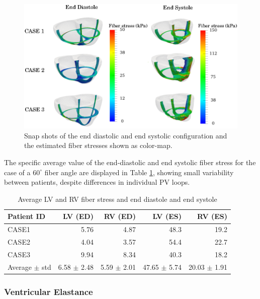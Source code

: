 \begin{figure}[htbp]
  \centering
  \includegraphics{figures/snapshots/stress}
  \caption{\label{paper3:fig:mesh_res_stress_snapshots}Snap shots of the end
    diastolic and end systolic configuration and the estimated fiber
    stresses shown as color-map.}
\end{figure}


The specific average value of the end-diastolic and end systolic fiber
stress for the case of a $60^{\circ}$ fiber angle are displayed in
Table \ref{paper3:tab:fiber_stress}, showing small variability between patients, despite differences in
individual PV loops.  

\begin{table}
  \centering
\caption{Average LV and RV fiber stress and end diastole and end systole}
\begin{tabular}{lrrrr}
\toprule
  Patient ID   &   LV (ED) &   RV (ED) &   LV (ES) &   RV (ES) \\
  \midrule
  CASE1        &      5.76 &      4.87 &      48.3 &      19.2 \\
  CASE2        &      4.04 &      3.57 &      54.4 &      22.7 \\
  CASE3        &      9.94 &      8.34 &      40.3 &      18.2 \\
  \hline
  Average $\pm$ std & 6.58 $\pm$ 2.48 & 5.59 $\pm$ 2.01 & 47.65 $\pm$ 5.74 & 20.03 $\pm$ 1.91 \\
\bottomrule
\end{tabular}
\label{paper3:tab:fiber_stress}
\end{table}


\subsubsection{Ventricular Elastance}

